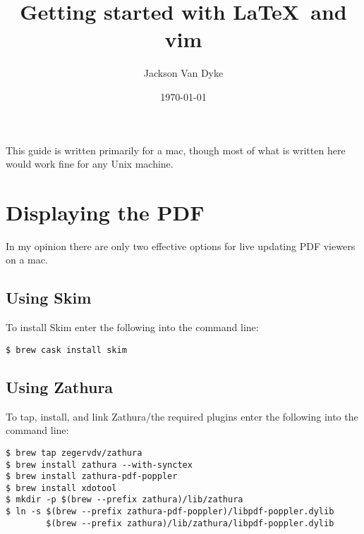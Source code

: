 \documentclass{amsart}
\begin{document}
\title{Getting started with \LaTeX\ and vim}
\author{Jackson Van Dyke}
\date{\today}
\maketitle

This guide is written primarily for a mac, though most of what is written here would work
fine for any Unix machine.

\section{Displaying the PDF}

In my opinion there are only two effective options for live updating PDF viewers on a mac.

\subsection{Using Skim}

To install Skim enter the following into the command line:
\begin{center}
\begin{verbatim}
$ brew cask install skim
\end{verbatim}
\end{center}

\subsection{Using Zathura}

To tap, install, and link Zathura/the required plugins 
enter the following into the command line:
\begin{center}
\begin{verbatim}
$ brew tap zegervdv/zathura
$ brew install zathura --with-synctex
$ brew install zathura-pdf-poppler
$ brew install xdotool
$ mkdir -p $(brew --prefix zathura)/lib/zathura
$ ln -s $(brew --prefix zathura-pdf-poppler)/libpdf-poppler.dylib 
        $(brew --prefix zathura)/lib/zathura/libpdf-poppler.dylib
\end{verbatim}
\end{center}
\end{document}
